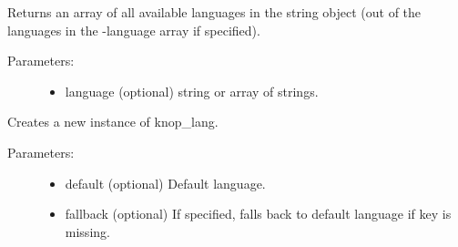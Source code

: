 \documentclass[letterpaper,10pt,english]{sphinxmanual}
\begin{document}
\begin{fulllineitems}

\begin{fulllineitems}
\label{knop_lang:knop_lang.languages}
Returns an array of all available languages in the string object (out of the
languages in the -language array if specified).
\begin{description}
\item[{Parameters:}] \leavevmode\begin{itemize}
\item {} 
language (optional)
string or array of strings.

\end{itemize}

\end{description}

\end{fulllineitems}


\begin{fulllineitems}
\label{knop_lang:knop_lang.onconvert}
\end{fulllineitems}


\begin{fulllineitems}
\label{knop_lang:knop_lang.oncreate}
\end{fulllineitems}


\begin{fulllineitems}
Creates a new instance of knop\_lang.
\begin{description}
\item[{Parameters:}] \leavevmode\begin{itemize}
\item {} 
default (optional)
Default language.

\item {} 
fallback (optional)
If specified, falls back to default language if key is missing.

\end{itemize}


\end{description}
\end{fulllineitems}
\end{fulllineitems}
\end{document}
